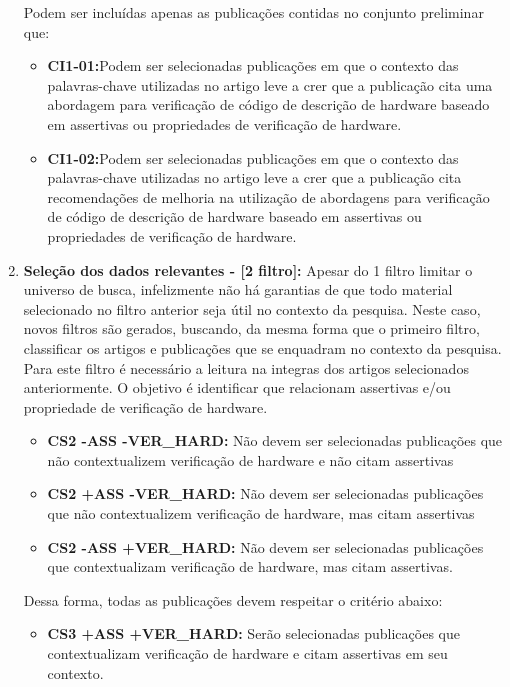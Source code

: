 \begin{enumerate}
Podem ser incluídas apenas as publicações contidas no conjunto preliminar que:

	\begin{itemize}
	\item \textbf{CI1-01:}Podem ser selecionadas publicações em que o contexto das palavras-chave utilizadas no artigo leve a crer que a publicação cita uma abordagem para verificação de código de descrição de hardware baseado em assertivas ou propriedades de verificação de hardware.
	\item \textbf{CI1-02:}Podem ser selecionadas publicações em que o contexto das palavras-chave utilizadas no artigo leve a crer que a publicação cita recomendações de melhoria na utilização de abordagens para verificação de código de descrição de hardware baseado em assertivas ou propriedades de verificação de hardware.
	\end{itemize}
\item \textbf{Seleção dos dados relevantes - [2 filtro]:} Apesar do 1 filtro limitar o universo de busca, infelizmente não há garantias de que todo material selecionado no filtro anterior seja útil no contexto da pesquisa. Neste caso, novos filtros são gerados, buscando, da mesma forma que o primeiro filtro, classificar os artigos e publicações que se enquadram no contexto da pesquisa. Para este filtro é necessário a leitura na integras dos artigos selecionados anteriormente. O objetivo é identificar que relacionam assertivas e/ou propriedade de verificação de hardware.
    \begin{itemize}
    \item \textbf{CS2 -ASS -VER\_HARD:} Não devem ser selecionadas publicações que não contextualizem verificação de hardware e não citam assertivas
    \item \textbf{CS2 +ASS -VER\_HARD:} Não devem ser selecionadas publicações que não contextualizem verificação de hardware, mas citam assertivas
    \item \textbf{CS2 -ASS +VER\_HARD:} Não devem ser selecionadas publicações que contextualizam verificação de hardware, mas citam assertivas.
    \end{itemize}
Dessa forma, todas as publicações devem respeitar o critério abaixo:
	\begin{itemize}
	\item \textbf{CS3 +ASS +VER\_HARD:} Serão selecionadas publicações que contextualizam verificação de hardware e citam assertivas em seu contexto.
	\end{itemize}     	
\end{enumerate}

